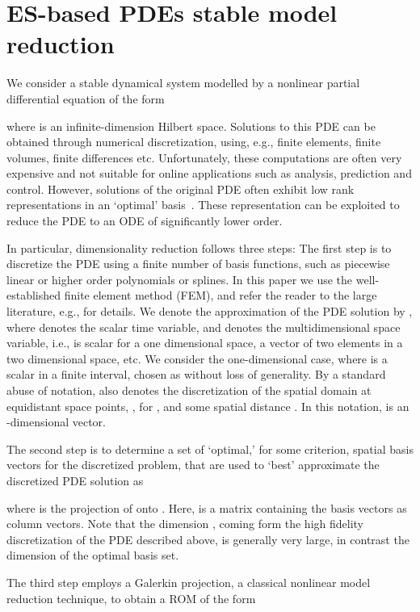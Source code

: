 \documentclass[letterpaper,conference,onecolumn,11pt]{IEEEtran}
\begin{document}
\section{ES-based PDEs stable model reduction}
\label{es-rom-stab} We consider a stable dynamical system modelled
by a nonlinear partial differential equation of the form

where  is an infinite-dimension Hilbert space.
Solutions to this PDE can be obtained through numerical
discretization, using, e.g., finite elements, finite volumes,
finite differences etc. Unfortunately, these computations are
often very expensive and not suitable for online applications such
as analysis, prediction and control. However, solutions of the
original PDE often exhibit low rank representations in an
`optimal' basis~\cite{HLB98}. These representation can be
exploited to reduce the PDE to an ODE of significantly lower
order.

In particular, dimensionality reduction follows three steps: The first
step is to discretize the PDE using a finite number of basis
functions, such as piecewise linear or higher order polynomials or
splines. In this paper we use the well-established finite element
method (FEM), and refer the reader to the large literature, e.g.,
\cite{S97,f83} for details. We denote the approximation of the PDE
solution by , where  denotes the scalar
time variable, and  denotes the multidimensional space variable,
i.e.,  is scalar for a one dimensional space, a vector of two
elements in a two dimensional space, etc. We consider the
one-dimensional case, where  is a scalar in a finite interval,
chosen as  without loss of generality. By a standard
abuse of notation,  also denotes the
discretization of the spatial domain at equidistant space points, , for , and some spatial distance
. In this notation,  is an -dimensional vector.

The second step is to determine a set of `optimal,' for some
criterion, spatial basis vectors  for the
discretized problem, that are used to `best' approximate the
discretized PDE solution as

where  is the projection of  onto . Here,
 is a  matrix containing the basis vectors 
as column vectors. Note that the dimension , coming form the high
fidelity discretization of the PDE described above, is generally very
large, in contrast the dimension  of the optimal basis set.

The third step employs a Galerkin projection, a classical nonlinear
model reduction technique,  to obtain a ROM of the form
\end{document}
